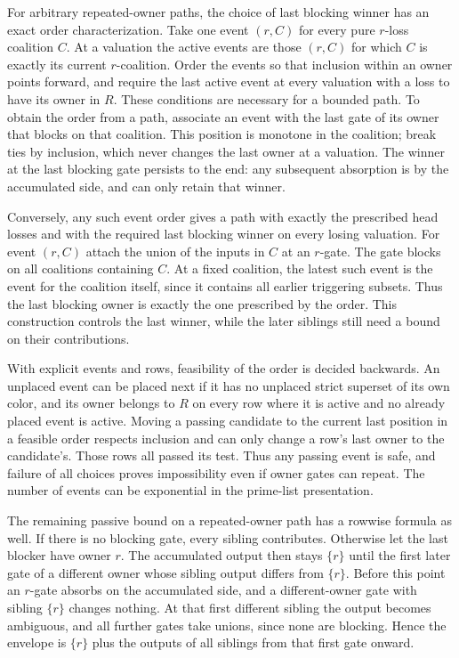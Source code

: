 For arbitrary repeated-owner paths, the choice of last blocking
winner has an exact order characterization. Take one event
$(r,C)$ for every pure $r$-loss coalition $C$. At a valuation
the active events are those $(r,C)$ for which $C$ is exactly
its current $r$-coalition. Order the events so that inclusion
within an owner points forward, and require the last active
event at every valuation with a loss to have its owner in $R$.
These conditions are necessary for a bounded path. To obtain
the order from a path, associate an event with the last gate
of its owner that blocks on that coalition. This position is
monotone in the coalition; break ties by inclusion, which
never changes the last owner at a valuation. The winner at
the last blocking gate persists to the end: any subsequent
absorption is by the accumulated side, and can only retain
that winner.

Conversely, any such event order gives a path with exactly
the prescribed head losses and with the required last blocking
winner on every losing valuation. For event $(r,C)$ attach
the union of the inputs in $C$ at an $r$-gate. The gate blocks
on all coalitions containing $C$. At a fixed coalition, the
latest such event is the event for the coalition itself,
since it contains all earlier triggering subsets. Thus the
last blocking owner is exactly the one prescribed by the
order. This construction controls the last winner, while
the later siblings still need a bound on their contributions.

With explicit events and rows, feasibility of the order is
decided backwards. An unplaced event can be placed next if
it has no unplaced strict superset of its own color, and its
owner belongs to $R$ on every row where it is active and no
already placed event is active. Moving a passing candidate
to the current last position in a feasible order respects
inclusion and can only change a row's last owner to the
candidate's. Those rows all passed its test. Thus any passing
event is safe, and failure of all choices proves impossibility
even if owner gates can repeat. The number of events can
be exponential in the prime-list presentation.

The remaining passive bound on a repeated-owner path has a
rowwise formula as well. If there is no blocking gate, every
sibling contributes. Otherwise let the last blocker have owner
$r$. The accumulated output then stays $\{r\}$ until the first
later gate of a different owner whose sibling output differs
from $\{r\}$. Before this point an $r$-gate absorbs on the
accumulated side, and a different-owner gate with sibling
$\{r\}$ changes nothing. At that first different sibling the
output becomes ambiguous, and all further gates take unions,
since none are blocking. Hence the envelope is $\{r\}$ plus
the outputs of all siblings from that first gate onward.

